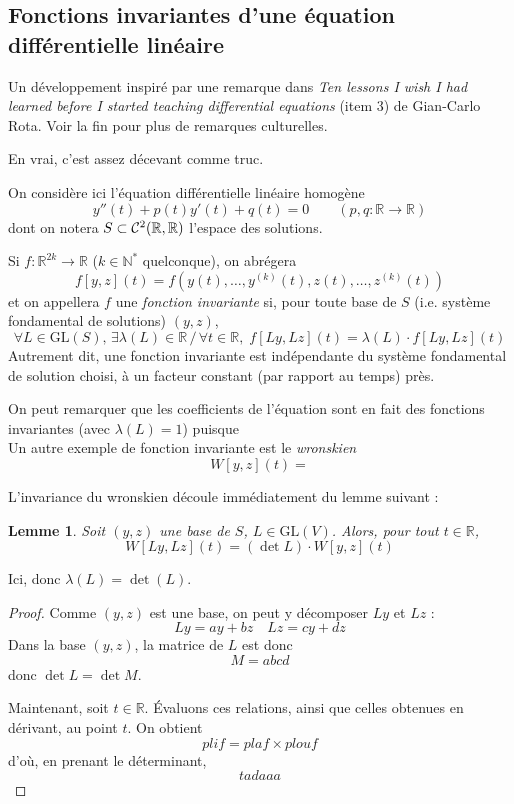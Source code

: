 \documentclass[a4paper, 11pt]{article}
\def\N{\mathbb{N}}
\def\R{\mathbb{R}}
\def\Cf{{\cal{C}}}
\def\GL{\mathrm{GL}}
\newtheorem*{lemma}{Lemme}
\begin{document}
\newpage

\subsection{Fonctions invariantes d'une équation différentielle linéaire}

Un développement inspiré par une remarque dans \emph{Ten lessons I wish I had
  learned before I started teaching differential equations} (item 3) de
Gian-Carlo Rota. Voir la fin pour plus de remarques culturelles.

En vrai, c'est assez décevant comme truc.

On considère ici l'équation différentielle linéaire
homogène
\[ y''(t) + p(t)y'(t) + q(t) = 0 \qquad (p, q : \R \to \R) \]
dont on notera $S \subset \Cf^2(\R, \R)$ l'espace des solutions.

Si $f : \R^{2k} \to \R$ ($k \in \N^*$ quelconque), on abrégera
\[ f[y,z](t) = f \left(y(t), \ldots, y^{(k)}(t), z(t), \ldots,
    z^{(k)}(t)\right) \]
et on appellera $f$ une \emph{fonction invariante} si, pour toute
base de $S$ (i.e. système fondamental de solutions) $(y, z)$,
\[
  \forall L \in \GL(S),\, \exists \lambda(L) \in \R \,/\, \forall t \in \R,\;
  f[Ly,Lz](t) = \lambda(L) \cdot f[Ly, Lz](t)
\]
Autrement dit, une fonction invariante est indépendante du système fondamental
de solution choisi, à un facteur constant (par rapport au temps) près.

On peut remarquer que les coefficients de l'équation sont en fait des fonctions
invariantes (avec $\lambda(L) = 1$) puisque
\[ \]
Un autre exemple de fonction invariante est le \emph{wronskien}
\[  W[y,z](t) =  \]

L'invariance du wronskien découle immédiatement du lemme suivant :
\begin{lemma}
  Soit $(y, z)$ une base de $S$, $L \in \GL(V)$. Alors, pour tout $t \in \R$,
  \[ W[Ly,Lz](t) = (\det L) \cdot W[y,z](t) \]
\end{lemma}
Ici, donc $\lambda(L) = \det(L)$.
\begin{proof}
  Comme $(y,z)$ est une base, on peut y décomposer $Ly$ et $Lz$ :
  \[ Ly = ay + bz \quad Lz = cy + dz \]
  Dans la base $(y,z)$, la matrice de $L$ est donc
  \[ M = abcd \]
  donc $\det L = \det M$.

  Maintenant, soit $t \in \R$. Évaluons ces relations, ainsi que celles obtenues
  en dérivant, au point $t$. On obtient
  \[ plif = plaf \times plouf \]
  d'où, en prenant le déterminant,
  \[ tadaaa \]
\end{proof}
\end{document}
